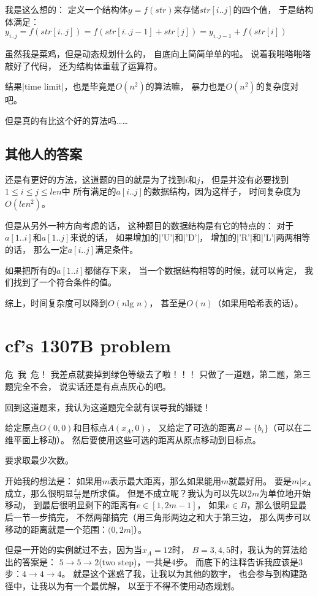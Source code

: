 我是这么想的：
定义一个结构体$y = f(str)$来存储$str[i..j]$的四个值，
于是结构体满足：
$y_{i..j}=f(str[i..j])=f(str[i..j-1]+str[j])=
y_{i..j-1}+f(str[i])$

虽然我是菜鸡，但是动态规划什么的，
自底向上简简单单的啦。
说着我啪嗒啪嗒敲好了代码，
还为结构体重载了运算符。

结果\vb|time limit|，也是毕竟是$O(n^2)$的算法嘛，
暴力也是$O(n^2)$的复杂度对吧。

但是真的有比这个好的算法吗\ldots\ldots

\subsection{其他人的答案}
还是有更好的方法，这道题的目的就是为了找到$i$和$j$，
但是并没有必要找到$1\le i\le j\le len$中%
所有满足的$a[i..j]$的数据结构，因为这样子，
时间复杂度为$O(len^2)$。

但是从另外一种方向考虑的话，
这种题目的数据结构是有它的特点的：
对于$a[1..i]$和$a[1..j]$来说的话，
如果增加的\vb|'U'|和\vb|'D'|，
增加的\vb|'R'|和\vb|'L'|两两相等的话，
那么一定$a[i..j]$满足条件。

如果把所有的$a[1..i]$都储存下来，
当一个数据结构相等的时候，就可以肯定，
我们找到了一个符合条件的值。

综上，时间复杂度可以降到$O(n \text{lg }n)$，
甚至是$O(n)$（如果用哈希表的话）。


\section{cf's 1307B problem}

危\ 我\ 危！
我差点就要掉到绿色等级去了啦！！！
只做了一道题，第二题，第三题完全不会，
说实话还是有点点灰心的吧。

回到这道题来，我认为这道题完全就有误导我的嫌疑！

给定原点$O(0,0)$和目标点$A(x_A,0)$，
又给定了可选的距离$B=\{b_i\}$（可以在二维平面上移动）。
然后要使用这些可选的距离从原点移动到目标点。

要求取最少次数。

开始我的想法是：
如果用$m$表示最大距离，那么如果能用$m$就最好用。
要是$m|x_A$成立，那么很明显$\frac{x_A}{m}$是所求值。
但是不成立呢？我认为可以先以$2m$为单位地开始移动，
到最后很明显剩下的距离有$e\in [1, 2m-1]$，
如果$e\in B$，那么很明显最后一节一步搞完，
不然两部搞完（用三角形两边之和大于第三边，
那么两步可以移动的距离就是一个范围：$(0, 2m]$）。

但是一开始的实例就过不去，因为当$x_A=12$时，
$B={3, 4, 5}$时，我认为的算法给出的答案是：
$5\to 5\to 2$(two step)，一共是4步。
而底下的注释告诉我应该是3步：$4\to 4\to 4$。
就是这个迷惑了我，让我以为其他的数字，
也会参与到构建路径中，让我以为有一个最优解，
以至于不得不使用动态规划。

